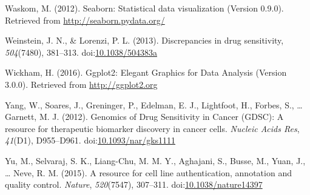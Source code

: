 \documentclass[man]{apa6}
\begin{document}
\hypertarget{ref-waskom2012}{}
Waskom, M. (2012). Seaborn: Statistical data visualization (Version
0.9.0). Retrieved from \url{http://seaborn.pydata.org/}

\hypertarget{ref-weinstein2013}{}
Weinstein, J. N., \& Lorenzi, P. L. (2013). Discrepancies in drug
sensitivity, \emph{504}(7480), 381--313.
doi:\href{https://doi.org/10.1038/504383a}{10.1038/504383a}

\hypertarget{ref-wickham2016}{}
Wickham, H. (2016). Ggplot2: Elegant Graphics for Data Analysis (Version
3.0.0). Retrieved from \url{http://ggplot2.org}

\hypertarget{ref-yang2012}{}
Yang, W., Soares, J., Greninger, P., Edelman, E. J., Lightfoot, H.,
Forbes, S., \ldots{} Garnett, M. J. (2012). Genomics of Drug Sensitivity
in Cancer (GDSC): A resource for therapeutic biomarker discovery in
cancer cells. \emph{Nucleic Acids Res}, \emph{41}(D1), D955--D961.
doi:\href{https://doi.org/10.1093/nar/gks1111}{10.1093/nar/gks1111}

\hypertarget{ref-yu2015}{}
Yu, M., Selvaraj, S. K., Liang-Chu, M. M. Y., Aghajani, S., Busse, M.,
Yuan, J., \ldots{} Neve, R. M. (2015). A resource for cell line
authentication, annotation and quality control. \emph{Nature},
\emph{520}(7547), 307--311.
doi:\href{https://doi.org/10.1038/nature14397}{10.1038/nature14397}

\endgroup
\end{document}
